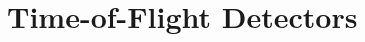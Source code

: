 \graphicspath{{02-TOF/Figures/}}

\newcommand{\Tzero}{\ensuremath{T0}}
\newcommand{\Gauss}{\ensuremath{\text{G}}}
\newcommand{\DT}{\ensuremath{\Delta T}}
\newcommand{\us}{\ensuremath{\mu\text{s}}}

\section{Time-of-Flight Detectors}
\label{Sect:TOF}





